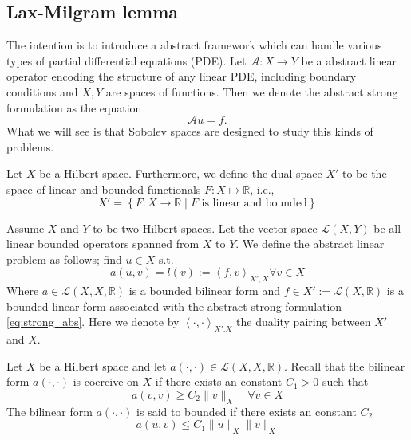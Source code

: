 \subsection{Lax-Milgram lemma}%
\label{sub:lax_milgram_lemma}

The intention is to introduce a abstract framework which can handle various types of partial differential equations (PDE). Let  $\mathcal{A} : X \to Y $ be a abstract linear operator encoding the structure of any linear PDE, including boundary
conditions and $X,Y$ are spaces of functions. Then we denote the abstract strong formulation as the equation
\begin{equation}
\label{eq:strong_abs}
\mathcal{A} u = f.
\end{equation}
What we will see is that Sobolev spaces are designed to study this kinds of problems.


\begin{definition}
    \label{def:linear_function}
Let $X$ be a Hilbert space. Furthermore, we define the dual space $X' $ to be the space of linear and bounded functionals $F: X  \mapsto \mathbb{R} $, i.e., \[
X'  = \left\{ F: X \to \mathbb{R}   \mid  F \text{ is linear and bounded} \right\}
\]
\end{definition}

\begin{problem}
    \label{def:abstract_linear_problem}
    Assume $X$ and $Y$  to be two Hilbert spaces. Let the vector space $\mathcal{L}( X,Y)  $ be all linear bounded operators spanned from $X$ to $Y$. We define the abstract linear problem as follows; find $u \in X$ s.t. \[
    a( u,v)  = l(v ) := \left<f,v \right>_{X' , X}  \forall v \in X
    \]
    Where $a \in  \mathcal{L} ( X, X,\mathbb{R} ) $ is a bounded bilinear form and $f \in X':= \mathcal{L} ( X,\mathbb{R} )  $ is a bounded linear form associated with the abstract strong formulation \eqref{eq:strong_abs}. Here we denote by $\left<\cdot ,\cdot  \right>_{X' .X} $ the duality pairing between $X' $ and $X
    $.

\end{problem}


\begin{definition}
    \label{def:coercivity}
    Let $X$ be a Hilbert space and let $a( \cdot ,\cdot )  \in  \mathcal{L} ( X, X,\mathbb{R} )  $. Recall that the bilinear form $a( \cdot ,\cdot ) $ is coercive on $X$ if there exists an constant $C_{1} > 0 $ such that \[
     a( v,v) \ge  C_{2} \| v \|_{ X }^{  } \quad  \forall v \in  X
    \]
     The bilinear form $a( \cdot ,\cdot ) $ is said to bounded if there exists an constant $C_{2}$  \[
    a( u,v)  \le C_{1} \| u \|_{ X }^{  }  \| v \|_{X }^{  }
    \]
\end{definition}


